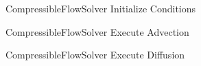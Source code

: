 \clearpage
   \begin{figure}
          \caption{CompressibleFlowSolver Initialize Conditions}\label{fig2}
        \centering
        
    \end{figure}

\clearpage
   \begin{figure}
          \caption{CompressibleFlowSolver Execute Advection}\label{fig3}
        \centering
        
   \end{figure}

\clearpage
   \begin{figure}
          \caption{CompressibleFlowSolver Execute Diffusion}\label{fig4}
        \centering
        
   \end{figure}









